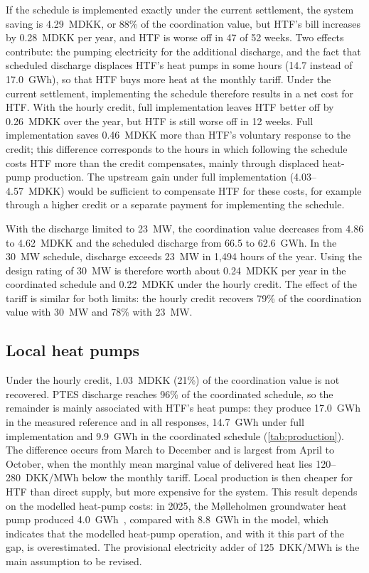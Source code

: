 If the schedule is implemented exactly under the current settlement, the system saving is 4.29~MDKK, or 88\% of the coordination value, but HTF's bill increases by 0.28~MDKK per year, and HTF is worse off in 47 of 52 weeks. Two effects contribute: the pumping electricity for the additional discharge, and the fact that scheduled discharge displaces HTF's heat pumps in some hours (14.7 instead of 17.0~GWh), so that HTF buys more heat at the monthly tariff. Under the current settlement, implementing the schedule therefore results in a net cost for HTF. With the hourly credit, full implementation leaves HTF better off by 0.26~MDKK over the year, but HTF is still worse off in 12 weeks. Full implementation saves 0.46~MDKK more than HTF's voluntary response to the credit; this difference corresponds to the hours in which following the schedule costs HTF more than the credit compensates, mainly through displaced heat-pump production. The upstream gain under full implementation (4.03--4.57~MDKK) would be sufficient to compensate HTF for these costs, for example through a higher credit or a separate payment for implementing the schedule.

With the discharge limited to 23~MW, the coordination value decreases from 4.86 to 4.62~MDKK and the scheduled discharge from 66.5 to 62.6~GWh. In the 30~MW schedule, discharge exceeds 23~MW in 1,494 hours of the year. Using the design rating of 30~MW is therefore worth about 0.24~MDKK per year in the coordinated schedule and 0.22~MDKK under the hourly credit. The effect of the tariff is similar for both limits: the hourly credit recovers 79\% of the coordination value with 30~MW and 78\% with 23~MW.

\subsection{Local heat pumps}
\label{sec:results-hp}

Under the hourly credit, 1.03~MDKK (21\%) of the coordination value is not recovered. PTES discharge reaches 96\% of the coordinated schedule, so the remainder is mainly associated with HTF's heat pumps: they produce 17.0~GWh in the measured reference and in all responses, 14.7~GWh under full implementation and 9.9~GWh in the coordinated schedule (\cref{tab:production}). The difference occurs from March to December and is largest from April to October, when the monthly mean marginal value of delivered heat lies 120--280~DKK/MWh below the monthly tariff. Local production is then cheaper for HTF than direct supply, but more expensive for the system. This result depends on the modelled heat-pump costs: in 2025, the Mølleholmen groundwater heat pump produced 4.0~GWh~\cite{htf_annual_report_2025}, compared with 8.8~GWh in the model, which indicates that the modelled heat-pump operation, and with it this part of the gap, is overestimated. The provisional electricity adder of 125~DKK/MWh is the main assumption to be revised.
